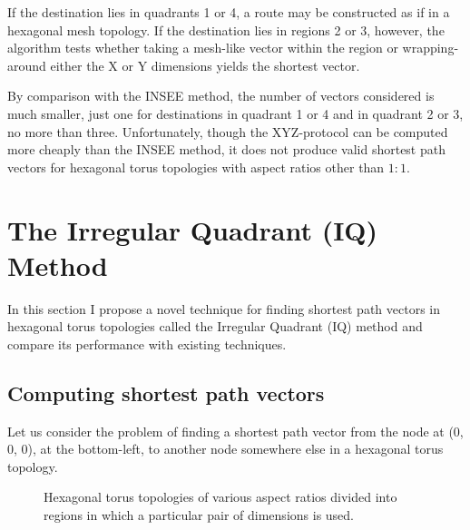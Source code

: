 				If the destination lies in quadrants 1 or 4, a route may be constructed
				as if in a hexagonal mesh topology. If the destination lies in regions
				2 or 3, however, the algorithm tests whether taking a mesh-like vector
				within the region or wrapping-around either the X or Y dimensions
				yields the shortest vector.
				
				By comparison with the INSEE method, the number of vectors considered
				is much smaller, just one for destinations in quadrant 1 or 4 and in
				quadrant 2 or 3, no more than three. Unfortunately, though the
				XYZ-protocol can be computed more cheaply than the INSEE method, it
				does not produce valid shortest path vectors for hexagonal torus
				topologies with aspect ratios other than $1:1$.
		
	\section{The Irregular Quadrant (IQ) Method}
		
		In this section I propose a novel technique for finding shortest path
		vectors in hexagonal torus topologies called the Irregular Quadrant (IQ)
		method and compare its performance with existing techniques.
		
		\subsection{Computing shortest path vectors}
		
			Let us consider the problem of finding a shortest path vector from the node
			at (0, 0, 0), at the bottom-left, to another node somewhere else in a
			hexagonal torus topology.
			
			\begin{figure}
				\center
				
				\caption[The four regions defined by the IQ method.]%
				{Hexagonal torus topologies of various aspect ratios divided
				into regions in which a particular pair of dimensions is used.}
				\label{fig:shortest-path-regions}
			\end{figure}
			
